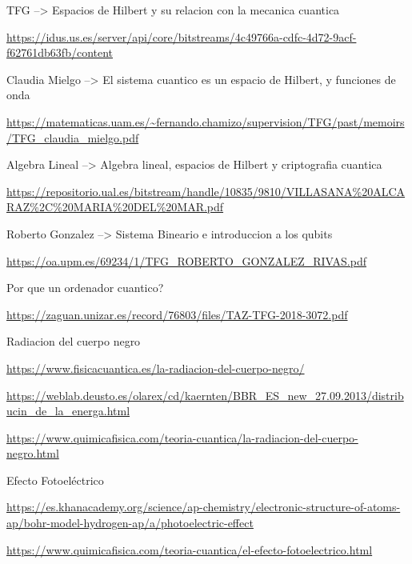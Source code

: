 \documentclass{article}
\numberwithin{equation}{section} %
\begin{document}
        TFG --> Espacios de Hilbert y su relacion con la mecanica cuantica\par
        \url{https://idus.us.es/server/api/core/bitstreams/4c49766a-cdfc-4d72-9acf-f62761db63fb/content}
        \vspace{2mm}

        Claudia Mielgo --> El sistema cuantico es un espacio de Hilbert, y funciones de onda\par
        \url{https://matematicas.uam.es/~fernando.chamizo/supervision/TFG/past/memoirs/TFG_claudia_mielgo.pdf}
        \vspace{2mm}

        Algebra Lineal --> Algebra lineal, espacios de Hilbert y criptografia cuantica\par
        \url{https://repositorio.ual.es/bitstream/handle/10835/9810/VILLASANA%20ALCARAZ%2C%20MARIA%20DEL%20MAR.pdf}
        \vspace{2mm}

        Roberto Gonzalez --> Sistema Bineario e introduccion a los qubits\par
        \url{https://oa.upm.es/69234/1/TFG_ROBERTO_GONZALEZ_RIVAS.pdf}
        \vspace{2mm}

        Por que un ordenador cuantico?\par
        \url{https://zaguan.unizar.es/record/76803/files/TAZ-TFG-2018-3072.pdf}
        \vspace{2mm}

        Radiacion del cuerpo negro\par
        \url{https://www.fisicacuantica.es/la-radiacion-del-cuerpo-negro/}
        \vspace{2mm}

        \url{https://weblab.deusto.es/olarex/cd/kaernten/BBR_ES_new_27.09.2013/distribucin_de_la_energa.html}
        \vspace{2mm}

        \url{https://www.quimicafisica.com/teoria-cuantica/la-radiacion-del-cuerpo-negro.html}
        \vspace{2mm}

        Efecto Fotoeléctrico\par
        \url{https://es.khanacademy.org/science/ap-chemistry/electronic-structure-of-atoms-ap/bohr-model-hydrogen-ap/a/photoelectric-effect}
        \vspace{2mm}

        \url{https://www.quimicafisica.com/teoria-cuantica/el-efecto-fotoelectrico.html}
        \vspace{2mm}
\end{document}
